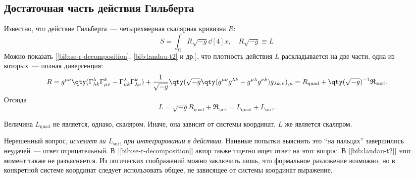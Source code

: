 \documentclass[\docroot/reports/draft/report.tex]{subfiles}
\begin{document}
\onlyinsubfile{\tableofcontents}

\subsection{Достаточная часть действия Гильберта}

    Известно, что действие Гильберта~--- четырехмерная скалярная кривизна $R$:
    \begin{equation*}
        S = \int_\Omega R \sqrt{-g} \dd[4]{x} , \quad R \sqrt{-g} \equiv L
    \end{equation*}
    Можно показать [\ref{bib:se-r-decomposition}, \ref{bib:landau-t2} и др.], что плотность действия $L$ раскладывается на две части, одна из которых~--- полная дивергенция:
    \begin{equation*}
        R = g^{\mu\nu} \qty(
            \Gamma^\lambda_{\lambda k}\Gamma^k_{\mu\nu} -
            \Gamma^\lambda_{\mu k}\Gamma^k_{\lambda\nu}
            ) + \frac{1}{\sqrt{-g}} \qty(
                \sqrt{-g} \qty(g^{\mu\nu}g^{\lambda k} - g^{\mu\lambda}g^{\nu k}) g_{\lambda k, \nu}
            )_{,\mu} = R_\text{quad} + \qty(\sqrt{-g})^{-1} \mathfrak{R}_\text{surf}.
    \end{equation*}
    Отсюда
    \begin{equation*}
        L = \sqrt{-g} R_\text{quad} + \mathfrak{R}_\text{surf} = L_\text{quad} + L_\text{surf} .
    \end{equation*}

    Величина $L_\text{quad}$ не является, однако, скаляром. Иначе, она зависит от системы координат. $L$ же является скаляром.

    Нерешенный вопрос, \textit{исчезает ли $L_\text{surf}$ при интегрировании в действии}. Наивные попытки выяснить это \enquote{на пальцах} завершились неудачей\footnotemark{}~--- ответ отрицательный. В [\ref{bib:se-r-decomposition}] автор также тщетно ищет ответ на этот вопрос. В [\ref{bib:landau-t2}] этот момент также не разъясняется. Из логических соображений можно заключить лишь, что формальное разложение возможно, но в конкретной системе координат следует использовать общее, не зависящее от системы координат выражение.

\end{document}
